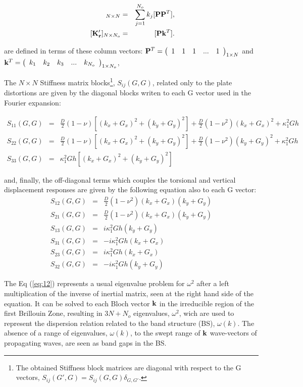 \documentclass[a4paper]{ICEDyn}
\begin{document}
\begin{eqnarray}
 [{\bf K_r}]_{N\times N} &=& \sum_{j=1}^{N_o}k_j[{\bf PP}^T],\label{Kr}\\
\ [{\bf K_r'}]_{N \times N_o} &=& [{\bf P}{\bf k}^T].
\end{eqnarray}

are defined in terms of these column vectors: ${\bf P}^T =\left (\begin{array}{c c c c c}1& 1& 1& ... &1\end{array}\right )_{1 \times N}$ and ${\bf k }^T =\left (\begin{array}{c c c c c c}k_1 & k_2 & k_3&...&k_{N_o}\end{array}\right )_{1\times N_o}$,

The $N \times N$ Stiffness matrix blocks\footnote{The obtained Stiffness block matrices are diagonal with respect to the G vectors, $S_{ij}(G',G)=S_{ij}(G,G)\delta_{G,G'}$.}, $S_{ij}(G,G)$, related only to the plate distortions are given by the diagonal blocks writen to each G vector used in the Fourier expansion:

	\begin{eqnarray}
	S_{11}(G,G) &=&  \frac{D}{2}(1-\nu)[(k_x+G_x)^2 + (k_y+G_y)^2]+\frac{D}{2}(1-\nu^2)(k_x + G_x)^2+ \kappa_{1}^{2}Gh\nonumber\\
	S_{22}(G,G) &=&  \frac{D}{2}(1-\nu)[(k_x+G_x)^2 + (k_y+G_y)^2]+\frac{D}{2}(1-\nu^2)(k_y + G_y)^2+ \kappa_{1}^{2}Gh\nonumber\\
	S_{33}(G,G) &=& \kappa_{1}^{2}Gh[(k_x + G_x)^2+(k_y + G_y)^2]\nonumber 
	\end{eqnarray}

and, finally, the off-diagonal terms which couples the torsional and vertical displacement responses are given by the following equation also to each G vector:
\begin{eqnarray}
    S_{12}(G,G) &=& \frac{D}{2}(1-\nu^2)(k_x+G_x)(k_y+G_y) \nonumber \\
	S_{21}(G,G) &=&  \frac{D}{2}(1-\nu^2)(k_x+G_x)(k_y+G_y) \nonumber\\ 
	S_{13}(G,G) &=& i\kappa_{1}^{2}Gh(k_y + G_y)\nonumber\\ 
	S_{31}(G,G) &=&  - i\kappa_{1}^{2}Gh(k_x + G_x)\nonumber \\
	S_{23}(G,G) &=& i\kappa_{1}^{2}Gh(k_x + G_x)\nonumber\\ 
	S_{32}(G,G) &=& - i\kappa_{1}^{2}Gh(k_y + G_y)\nonumber 
	\end{eqnarray}
   
	The Eq (\ref{eq:12}) represents a usual eigenvalue problem for $\omega^2$ after a left multiplication of the inverse of inertial matrix, seen at the right hand side of the equation. It can be solved to each Bloch vector ${\bf k}$ in the irreducible region of the first Brillouin Zone, resulting in  $3N + N_o$ eigenvalues, $\omega^2$, wich are used to represent the dispersion relation related to the band structure (BS), $\omega(k)$. The absence of a range of eigenvalues, $\omega(k)$, to the swept range of ${\bf k}$ wave-vectors of propagating waves, are seen as band gaps in the BS.
	 
\end{document}
